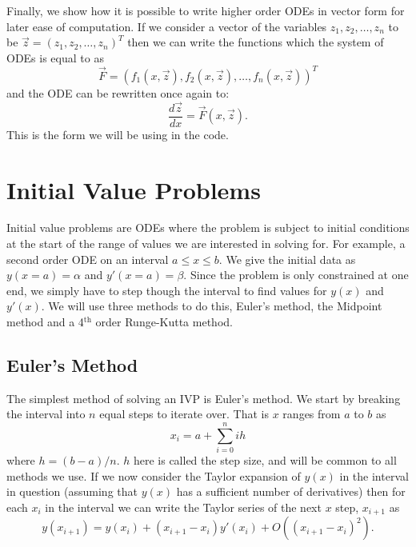 \documentclass[a4paper,11pt]{report}
\begin{document}
Finally, we show how it is possible to write higher order ODEs in vector form for later ease of computation. If we consider a vector of the variables $z_1, z_2, \ldots, z_n$ to be $\vec{z} = (z_1, z_2, \ldots, z_n)^{T}$ then we can write the functions which the system of ODEs is equal to as $$\vec{F} = (f_1(x, \vec{z}), f_2(x, \vec{z}), \ldots, f_n(x, \vec{z}))^{T}$$ and the ODE can be rewritten once again to:
\begin{equation} \label{ode-vectored}
	\frac{d \vec{z}}{dx} = \vec{F}(x, \vec{z}) .
\end{equation}
This is the form we will be using in the code.

\section{Initial Value Problems}

Initial value problems are ODEs where the problem is subject to initial conditions at the start of the range of values we are interested in solving for. For example, a second order ODE on an interval $a \leq x \leq b$. We give the initial data as $y(x=a) = \alpha$ and $y'(x=a) = \beta$. Since the problem is only constrained at one end, we simply have to step though the interval to find values for $y(x)$ and $y'(x)$. We will use three methods to do this, Euler's method, the Midpoint method and a 4$^{\text{th}}$ order Runge-Kutta method.

\subsection{Euler's Method}

The simplest method of solving an IVP is Euler's method. We start by breaking the interval into $n$ equal steps to iterate over. That is $x$ ranges from $a$ to $b$ as
\begin{equation} \label{mesh}
	x_i = a + \sum_{i=0}^{n} ih
\end{equation}
where $h = (b-a)/n$. $h$ here is called the step size, and will be common to all methods we use. If we now consider the Taylor expansion of $y(x)$ in the interval in question (assuming that $y(x)$ has a sufficient number of derivatives) then for each $x_i$ in the interval we can write the Taylor series of the next $x$ step, $x_{i+1}$ as \cite{burden}
\begin{equation}
	y(x_{i+1}) = y(x_i) + (x_{i+1} - x_i) y'(x_i) + O((x_{i+1} - x_i)^2) .
\end{equation}
\end{document}
